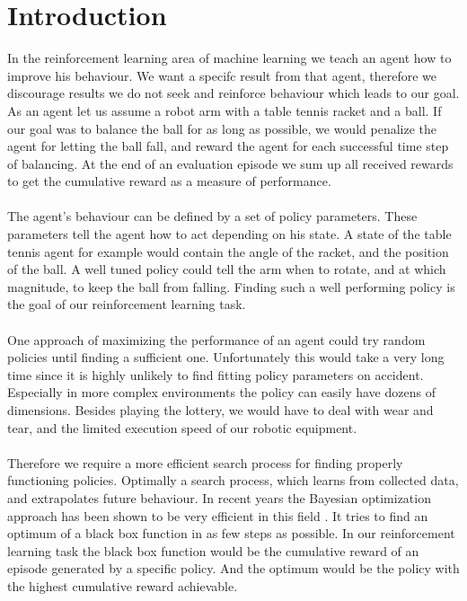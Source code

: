 
\chapter{Introduction}
\label{chap:0}

In the reinforcement learning area of machine learning we teach an agent how to improve his behaviour. We want a specifc result from that agent, therefore we discourage results we do not seek and reinforce behaviour which leads to our goal. As an agent let us assume a robot arm with a table tennis racket and a ball. If our goal was to balance the ball for as long as possible, we would penalize the agent for letting the ball fall, and reward the agent for each successful time step of balancing. At the end of an evaluation episode we sum up all received rewards to get the cumulative reward as a measure of performance.\\
\\
The agent's behaviour can be defined by a set of policy parameters. These parameters tell the agent how to act depending on his state. A state of the table tennis agent for example would contain the angle of the racket, and the position of the ball. A well tuned policy could tell the arm when to rotate, and at which magnitude, to keep the ball from falling. Finding such a well performing policy is the goal of our reinforcement learning task.\\
\\
One approach of maximizing the performance of an agent could try random policies until finding a sufficient one. Unfortunately this would take a very long time since it is highly unlikely to find fitting policy parameters on accident. Especially in more complex environments the policy can easily have dozens of dimensions. Besides playing the lottery, we would have to deal with wear and tear, and the limited execution speed of our robotic equipment.\\
\\
Therefore we require a more efficient search process for finding properly functioning policies. Optimally a search process, which learns from collected data, and extrapolates future behaviour. In recent years the Bayesian optimization approach has been shown to be very efficient in this field \cite{brochu2010tutorial, shahriari2016taking, lizotte2008practical}. It tries to find an optimum of a black box function in as few steps as possible. In our reinforcement learning task the black box function would be the cumulative reward of an episode generated by a specific policy. And the optimum would be the policy with the highest cumulative reward achievable.\\
